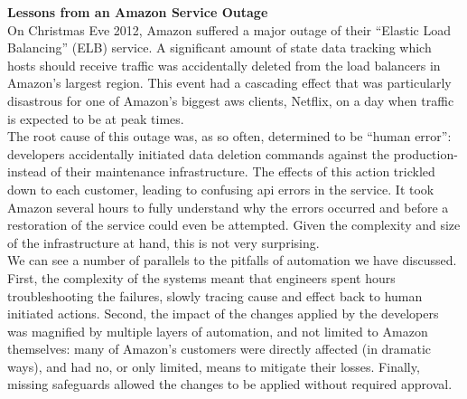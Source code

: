 \begin{sidenote}
{\bf Lessons from an Amazon Service Outage} \\

On Christmas Eve 2012, Amazon suffered a major outage
of their ``Elastic Load Balancing'' (ELB)
service\cite{automation:aws-outage}.  A significant
amount of state data tracking which hosts should
receive traffic was accidentally deleted from the load
balancers in Amazon's largest region.  This event had
a cascading effect that was particularly disastrous
for one of Amazon's biggest \gls{aws} clients,
Netflix, on a day when traffic is expected to be at
peak times. \\ [10pt]

The root cause of this outage was, as so often,
determined to be ``human error'': developers
accidentally initiated data deletion commands against
the production- instead of their maintenance
infrastructure.  The effects of this action trickled
down to each customer, leading to confusing \gls{api}
errors in the service.  It took Amazon several hours
to fully understand why the errors occurred and before
a restoration of the service could even be attempted.
Given the complexity and size of the infrastructure at
hand, this is not very surprising. \\ [10pt]


We can see a number of parallels to the pitfalls of
automation we have discussed. First, the complexity of
the systems meant that engineers spent hours
troubleshooting the failures, slowly tracing cause and
effect back to human initiated actions. Second, the
impact of the changes applied by the developers was
magnified by multiple layers of automation, and not
limited to Amazon themselves: many of Amazon's
customers were directly affected (in dramatic ways),
and had no, or only limited, means to mitigate their
losses.  Finally, missing safeguards allowed the
changes to be applied without required approval.
\end{sidenote}


